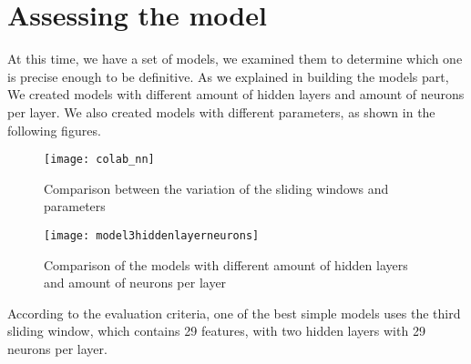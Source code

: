 \section{Assessing the model}

At this time, we have a set of models, we examined them to determine which one is precise enough to be definitive.\newline \newline
As we explained in building the models part, We created models with different amount of hidden layers and amount of neurons per layer. We also created models with different parameters, as shown in the following figures.\newline \newline


\begin{figure}[h]
\label{fig:colab_nn}
\begin{center}
\texttt{[image: colab\_nn]}
\end{center}
\caption{Comparison between the variation of the sliding windows and parameters}
\end{figure}

\begin{figure}[h]
\label{fig:model3hiddenlayerneurons}
\begin{center}
\texttt{[image: model3hiddenlayerneurons]}
\end{center}
\caption{Comparison of the models with different amount of hidden layers and amount of neurons per layer}
\end{figure}
According to the evaluation criteria, one of the best simple models uses the third sliding window, which contains 29 features, with two hidden layers with 29 neurons per layer.

